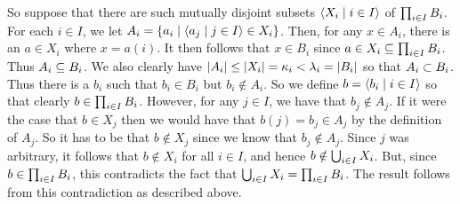 \begin{questions}
{{    So suppose that there are such mutually disjoint subsets $\angles{X_i \where i \in I}$ of $\prodi B_i$.
    For each $i \in I$, we let $A_i = \braces{a_i \where \angles{a_j \where j \in I} \in X_i}$.
    Then, for any $x \in A_i$, there is an $a \in X_i$ where $x = a(i)$.
    It then follows that $x \in B_i$ since $a \in X_i \ss \prodi B_i$.
    Thus $A_i \ss B_i$.
    We also clearly have $\abs{A_i} \leq \abs{X_i} = \k_i < \l_i = \abs{B_i}$ so that $A_i \pss B_i$.
    Thus there is a $b_i$ such that $b_i \in B_i$ but $b_i \notin A_i$.
    So we define $b = \angles{b_i \where i \in I}$ so that clearly $b \in \prodi B_i$.
    However, for any $j \in I$, we have that $b_j \notin A_j$.
    If it were the case that $b \in X_j$ then we would have that $b(j) = b_j \in A_j$ by the definition of $A_j$.
    So it has to be that $b \notin X_j$ since we know that $b_j \notin A_j$.
    Since $j$ was arbitrary, it follows that $b \notin X_i$ for all $i \in I$, and hence $b \notin \uni X_i$.
    But, since $b \in \prodi B_i$, this contradicts the fact that $\uni X_i = \prodi B_i$.
    The result follows from this contradiction as described above.
  }
}

\end{questions}

